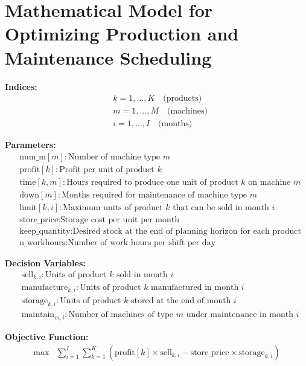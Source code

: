 \documentclass{article}
\begin{document}
\section*{Mathematical Model for Optimizing Production and Maintenance Scheduling}

\textbf{Indices:}
\begin{align*}
& k = 1, \ldots, K \quad \text{(products)} \\
& m = 1, \ldots, M \quad \text{(machines)} \\
& i = 1, \ldots, I \quad \text{(months)}
\end{align*}

\textbf{Parameters:}
\begin{align*}
& \text{num\_m}[m]: \text{Number of machine type } m \\
& \text{profit}[k]: \text{Profit per unit of product } k \\
& \text{time}[k, m]: \text{Hours required to produce one unit of product } k \text{ on machine } m \\
& \text{down}[m]: \text{Months required for maintenance of machine type } m \\
& \text{limit}[k, i]: \text{Maximum units of product } k \text{ that can be sold in month } i \\
& \text{store\_price}: \text{Storage cost per unit per month} \\
& \text{keep\_quantity}: \text{Desired stock at the end of planning horizon for each product} \\
& \text{n\_workhours}: \text{Number of work hours per shift per day}
\end{align*}

\textbf{Decision Variables:}
\begin{align*}
& \text{sell}_{k, i}: \text{Units of product } k \text{ sold in month } i \\
& \text{manufacture}_{k, i}: \text{Units of product } k \text{ manufactured in month } i \\
& \text{storage}_{k, i}: \text{Units of product } k \text{ stored at the end of month } i \\
& \text{maintain}_{m, i}: \text{Number of machines of type } m \text{ under maintenance in month } i 
\end{align*}

\textbf{Objective Function:}
\begin{align*}
\max & \sum_{i=1}^{I} \sum_{k=1}^{K} \left( \text{profit}[k] \times \text{sell}_{k, i} - \text{store\_price} \times \text{storage}_{k, i} \right)
\end{align*}
\end{document}

